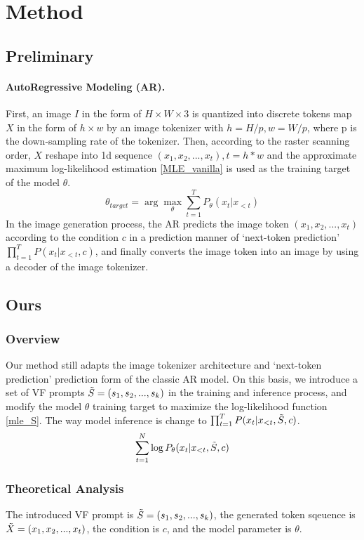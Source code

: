 \section{Method}



\subsection{Preliminary}
\paragraph{AutoRegressive Modeling (AR).} First, an image $I$ in the form of $H\times W \times 3$ is quantized into discrete tokens map $X$ in the form of $h\times w$ by an image tokenizer with $h=H/p, w=W/p$, where p is the down-sampling rate of the tokenizer. Then, according to the raster scanning order, $X$ reshape into 1d sequence $(x_1,x_2,...,x_t), t=h*w$ and the approximate maximum log-likelihood estimation \ref{MLE_vanilla} is used as the training target of the model $\theta$.
\begin{equation}
    \theta_{target} = \arg\max_{\theta} \sum^{T}_{t=1}P_{\theta}(x_t|x_{<t})
    \label{MLE_vanilla}
\end{equation}
In the image generation process, the AR predicts the image token $(x_1,x_2,...,x_t)$ according to the condition $c$ in a prediction manner of `next-token prediction' $\prod^{T}_{t=1}P(x_t|x_{<t},c)$, and finally converts the image token into an image by using a decoder of the image tokenizer.
\subsection{Ours}
\subsubsection{Overview}
Our method still adapts the image tokenizer architecture and `next-token prediction' prediction form of the classic AR model. On this basis, we introduce a set of VF prompts $\Tilde{S}=(s_1,s_2,...,s_k)$ in the training and inference process, and modify the model $\theta$ training target to maximize the log-likelihood function \ref{mle_S}. The way model inference is change to $\prod^{T}_{t=1}P(x_t|x_{<t},\Tilde{S},c)$.
\begin{equation}
    \sum^N_{t=1}\log P_{\theta}(x_t|x_{<t},\Tilde{S},c)
    \label{mle_S}
\end{equation}
\subsubsection{Theoretical Analysis}
\label{theory}
The introduced VF prompt is $\Tilde{S}=(s_1,s_2,...,s_k)$, the generated token sqeuence is $\Tilde{X}=(x_1,x_2,...,x_t)$, the condition is $c$, and the model parameter is $\theta$.

